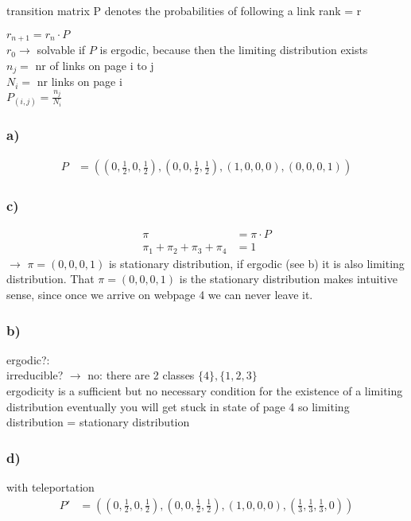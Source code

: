 transition matrix P denotes the probabilities of following a link
 rank = r


$r_{{n+1}}=r_{n}\cdot P$\\
$r_{0} \rightarrow$  solvable if $P$ is ergodic, because then the limiting distribution exists\\
$n_{j}=$ nr of links on page i to j\\
$N_{i}=$  nr links on page i\\
$P_{{\left(i,j\right)}}=\frac{n_{j}}{N_{i}}$\\


\subsubsection*{ a) }
\begin{align*}
P&=\left(\left(0,\frac{1}{2},0,\frac{1}{2}\right),\left(0,0,\frac{1}{2},\frac{1}{2}\right),\left(1,0,0,0\right),\left(0,0,0,1\right)\right)
\end{align*}
\subsubsection*{ c) }
\begin{align*}
\pi&=\pi\cdot P\\
\pi_{1}+\pi_{2}+\pi_{3}+\pi_{4}&=1
\end{align*}
$\rightarrow$ $\pi=\left(0,0,0,1\right)$  is stationary distribution, if ergodic (see b) it is also limiting distribution.
That $\pi=\left(0,0,0,1\right)$ is the stationary distribution makes intuitive sense, since once we arrive on webpage 4
we can never leave it.

\subsubsection*{ b) }

ergodic?:\\
irreducible? $\rightarrow$ no: there are 2 classes $\{4\},\{1,2,3\}$\\
ergodicity is a sufficient but no necessary condition for the existence of a limiting distribution
eventually you will get stuck in state of page 4 so limiting distribution = stationary distribution

\subsubsection*{ d) }
with teleportation
\begin{align*}
P' &=\left(\left(0,\frac{1}{2},0,\frac{1}{2}\right),\left(0,0,\frac{1}{2},\frac{1}{2}\right),\left(1,0,0,0\right),\left(\frac{1}{3},\frac{1}{3},\frac{1}{3},0\right)\right)
\end{align*}
